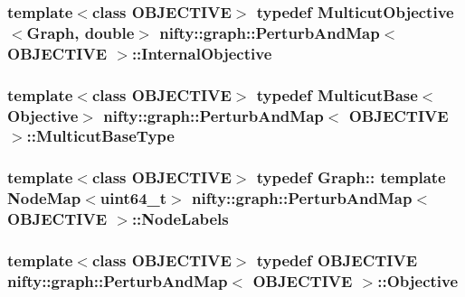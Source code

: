 \subsubsection[{Internal\+Objective}]{\setlength{\rightskip}{0pt plus 5cm}template$<$class O\+B\+J\+E\+C\+T\+I\+V\+E$>$ typedef {\bf Multicut\+Objective}$<${\bf Graph}, double$>$ {\bf nifty\+::graph\+::\+Perturb\+And\+Map}$<$ O\+B\+J\+E\+C\+T\+I\+V\+E $>$\+::{\bf Internal\+Objective}}\label{classnifty_1_1graph_1_1PerturbAndMap_a30b65b32da50e2c0cc369e3942dd15ff}
\hypertarget{classnifty_1_1graph_1_1PerturbAndMap_a5727b6e7c9ec80660ff94d9ccace8fe5}{}
\subsubsection[{Multicut\+Base\+Type}]{\setlength{\rightskip}{0pt plus 5cm}template$<$class O\+B\+J\+E\+C\+T\+I\+V\+E$>$ typedef {\bf Multicut\+Base}$<${\bf Objective}$>$ {\bf nifty\+::graph\+::\+Perturb\+And\+Map}$<$ O\+B\+J\+E\+C\+T\+I\+V\+E $>$\+::{\bf Multicut\+Base\+Type}}\label{classnifty_1_1graph_1_1PerturbAndMap_a5727b6e7c9ec80660ff94d9ccace8fe5}
\hypertarget{classnifty_1_1graph_1_1PerturbAndMap_aaf657e3c33a321710e6db17adb3df3ff}{}
\subsubsection[{Node\+Labels}]{\setlength{\rightskip}{0pt plus 5cm}template$<$class O\+B\+J\+E\+C\+T\+I\+V\+E$>$ typedef Graph\+:: template Node\+Map$<$uint64\+\_\+t$>$ {\bf nifty\+::graph\+::\+Perturb\+And\+Map}$<$ O\+B\+J\+E\+C\+T\+I\+V\+E $>$\+::{\bf Node\+Labels}}\label{classnifty_1_1graph_1_1PerturbAndMap_aaf657e3c33a321710e6db17adb3df3ff}
\hypertarget{classnifty_1_1graph_1_1PerturbAndMap_a472da1848b099c685994a2cc915b02ed}{}
\subsubsection[{Objective}]{\setlength{\rightskip}{0pt plus 5cm}template$<$class O\+B\+J\+E\+C\+T\+I\+V\+E$>$ typedef O\+B\+J\+E\+C\+T\+I\+V\+E {\bf nifty\+::graph\+::\+Perturb\+And\+Map}$<$ O\+B\+J\+E\+C\+T\+I\+V\+E $>$\+::{\bf Objective}}\label{classnifty_1_1graph_1_1PerturbAndMap_a472da1848b099c685994a2cc915b02ed}



